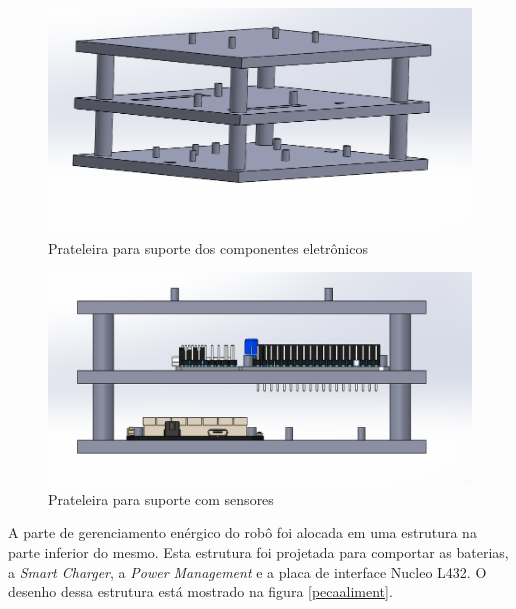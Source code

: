  \begin{figure}[H]
 	\centering
 	\includegraphics[width=14cm]{Figures/prateleira.png}
 	\caption{Prateleira para suporte dos componentes eletrônicos} \label{Prateleira}
 \end{figure}
 
  \begin{figure}[H]
  	\centering
  	\includegraphics[width=16cm]{Figures/prateleiracsensores.png}
  	\caption{Prateleira para suporte com sensores} \label{Prateleiracsensor}
  \end{figure}
 

A parte de gerenciamento enérgico do robô foi alocada em uma estrutura na parte inferior do mesmo. Esta estrutura foi projetada para comportar as baterias, a \textit{Smart Charger}, a \textit{Power Management} e a placa de interface Nucleo L432. O desenho dessa estrutura está mostrado na figura \ref{pecaaliment}.

